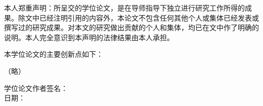 \clearpagebyprint
\begin{center}
\end{center}

\vspace{7mm}
本人郑重声明：所呈交的学位论文，是在导师指导下独立进行研究工作所得的成果。除文中已经注明引用的内容外，本论文不包含任何其他个人或集体已经发表或撰写过的研究成果。对本文的研究做出贡献的个人和集体，均已在文中作了明确的说明。本人完全意识到本声明的法律结果由本人承担。\par
本学位论文的主要创新点如下：

\par
（略）\par





\vspace{20mm}

\begin{flushright}
	学位论文作者签名：\qquad\qquad\qquad\qquad\qquad\qquad\qquad
	\\
	\vspace{7mm}
	日期：\qquad\qquad\qquad\qquad\qquad\qquad\qquad
\end{flushright}